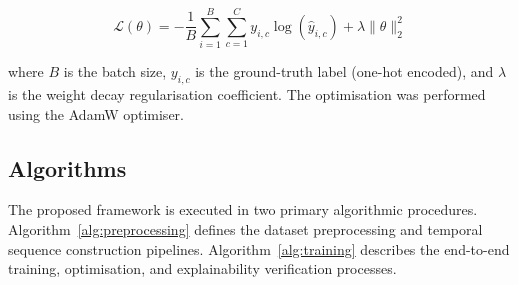 \documentclass[a4paper,fleqn]{cas-sc}
\begin{document}
\begin{equation}
\mathcal{L}(\theta) = - \frac{1}{B} \sum_{i=1}^{B} \sum_{c=1}^{C} y_{i, c} \log(\hat{y}_{i, c}) + \lambda \|\theta\|_2^2
\end{equation}

where $B$ is the batch size, $y_{i, c}$ is the ground-truth label (one-hot encoded), and $\lambda$ is the weight decay regularisation coefficient. The optimisation was performed using the AdamW optimiser.

\subsection{Algorithms}

The proposed framework is executed in two primary algorithmic procedures. Algorithm~\ref{alg:preprocessing} defines the dataset preprocessing and temporal sequence construction pipelines. Algorithm~\ref{alg:training} describes the end-to-end training, optimisation, and explainability verification processes.
\end{document}
